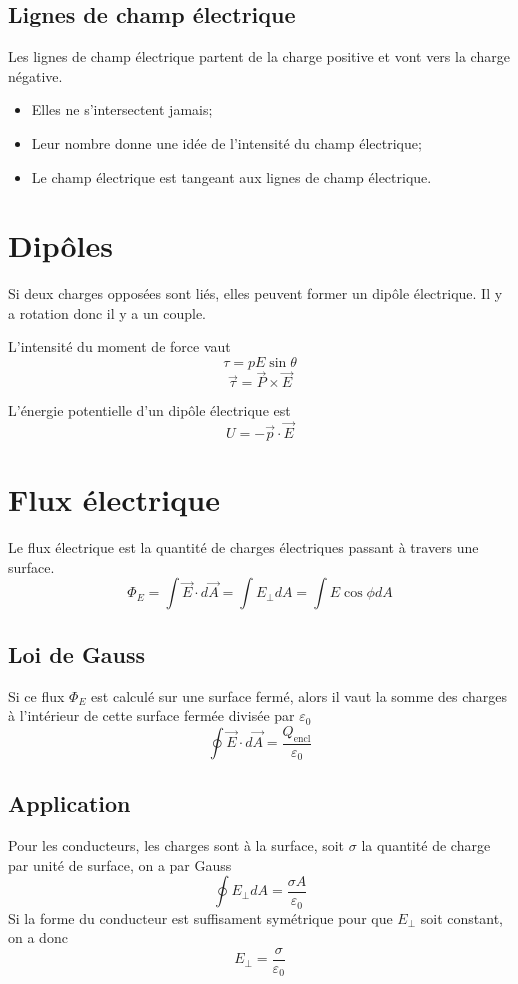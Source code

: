 \subsection{Lignes de champ électrique}
Les lignes de champ électrique partent de la charge positive et vont vers la charge négative.
\begin{itemize}
	\item Elles ne s'intersectent jamais;
	\item Leur nombre donne une idée de l'intensité du champ électrique;
	\item Le champ électrique est tangeant aux lignes de champ électrique.
\end{itemize}

\section{Dipôles}
Si deux charges opposées sont liés, elles peuvent former un dipôle électrique.
Il y a rotation donc il y a un couple.

L'intensité du moment de force vaut
\[ \tau = pE\sin{\theta} \]
\[ \vec{\tau} = \vec{P} \times \vec{E} \]

L'énergie potentielle d'un dipôle électrique est
\[ U = -\vec{p} \cdot \vec{E} \]

\section{Flux électrique}
Le flux électrique est la quantité de charges électriques passant à travers une surface.
\[ \Phi_E = \int \vec{E} \cdot d\vec{A} = \int E_{\perp} dA = \int E\cos\phi dA \]
\subsection{Loi de Gauss}
Si ce flux $\Phi_E$ est calculé sur une surface fermé, alors il vaut la somme des charges à l'intérieur de cette surface fermée divisée par $\varepsilon_0$
\[ \oint \vec{E} \cdot d\vec{A} = \frac{Q_\mathrm{encl}}{\varepsilon_0} \]
\subsection{Application}
Pour les conducteurs, les charges sont à la surface, soit $\sigma$ la quantité de charge par unité de surface, on a par Gauss
\[ \oint E_\perp dA = \frac{\sigma A}{\varepsilon_0} \]
Si la forme du conducteur est suffisament symétrique pour que $E_\perp$ soit constant, on a donc
\[ E_{\perp} = \frac{\sigma}{\varepsilon_0} \]


